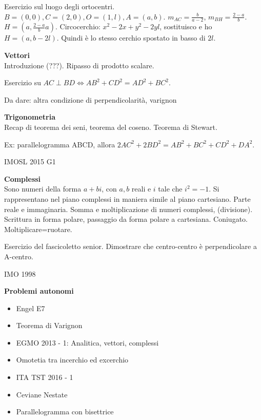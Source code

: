 \vspace{0.3cm}

Esercizio sul luogo degli ortocentri. $B=(0,0),C=(2,0),O=(1,l),A=(a,b)$. 
$m_{AC}=\frac{b}{a-2}$, $m_{BH}=\frac{2-a}{b}$. $H=(a,\frac{2-a}{b}a)$.
Circocerchio: $x^2-2x+y^2-2yl$, sostituisco e ho $H=(a,b-2l)$. Quindi è lo stesso cerchio spostato in basso di $2l$.

\vspace{0.4cm}
\textbf{Vettori}\\
Introduzione (???). Ripasso di prodotto scalare.

Esercizio su $AC\perp BD \iff AB^2+CD^2=AD^2+BC^2$. 

Da dare: altra condizione di perpendicolarità, varignon


\textbf{Trigonometria}\\
Recap di teorema dei seni, teorema del coseno. Teorema di Stewart.

Ex: parallelogramma ABCD, allora $2AC^2+2BD^2=AB^2+BC^2+CD^2+DA^2$.

IMOSL 2015 G1



\vspace{0.4cm}
\textbf{Complessi}\\
Sono numeri della forma $a+bi$, con $a,b$ reali e $i$ tale che $i^2=-1$. Si rappresentano nel piano complessi in maniera simile al piano cartesiano. Parte reale e immaginaria. Somma e moltiplicazione di numeri complessi, (divisione).\\
Scrittura in forma polare, passaggio da forma polare a cartesiana. Coniugato. Moltiplicare=ruotare. 

Esercizio del fascicoletto senior. Dimostrare che centro-centro è perpendicolare a A-centro.

IMO 1998


\vspace{0.4cm}
\Large \textbf{Problemi autonomi}\normalsize
\begin{itemize}
 \item Engel E7
 \item Teorema di Varignon 
 \item EGMO 2013 - 1: Analitica, vettori, complessi
 \item Omotetia tra incerchio ed excerchio
 \item ITA TST 2016 - 1
 \item Ceviane Nestate
 \item Parallelogramma con bisettrice
 
\end{itemize}





